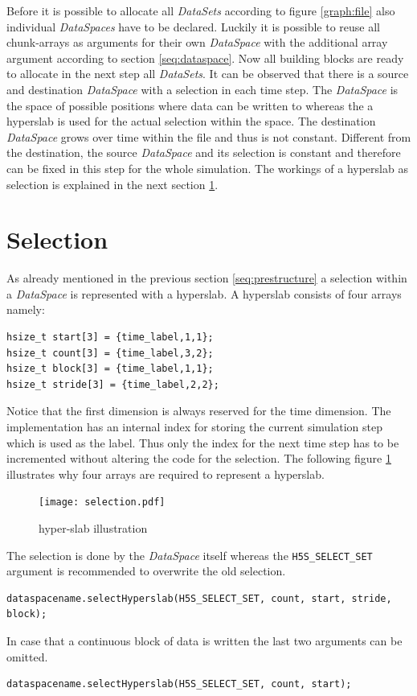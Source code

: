 Before it is possible to allocate all \textit{DataSets} according to figure \ref{graph:file} also individual \textit{DataSpaces} have to be declared. Luckily it is possible to reuse all chunk-arrays as arguments for their own \textit{DataSpace} with the additional array argument according to section \ref{seq:dataspace}. Now all building blocks are ready to allocate in the next step all \textit{DataSets}. It can be observed that there is a source and destination \textit{DataSpace} with a selection in each time step. The \textit{DataSpace} is the space of possible positions where data can be written to whereas the a hyperslab is used for the actual selection within the space. The destination \textit{DataSpace} grows over time within the file and thus is not constant. Different from the destination, the source \textit{DataSpace} and its selection is constant and therefore can be fixed in this step for the whole simulation. The workings of a hyperslab as selection is explained in the next section \ref{seq:selection}.

\section{Selection}
\label{seq:selection}
As already mentioned in the previous section \ref{seq:prestructure} a selection within a \textit{DataSpace} is represented with a hyperslab. A hyperslab consists of four arrays namely:
\begin{lstlisting}
hsize_t start[3] = {time_label,1,1};
hsize_t count[3] = {time_label,3,2};
hsize_t block[3] = {time_label,1,1};
hsize_t stride[3] = {time_label,2,2};
\end{lstlisting}
Notice that the first dimension is always reserved for the time dimension. The implementation has an internal index for storing the current simulation step which is used as the label. Thus only the index for the next time step has to be incremented without altering the code for the selection. The following figure \ref{fig:hyperslab} illustrates why four arrays are required to represent a hyperslab.

\begin{figure}[ht!]
\centering
\texttt{[image: selection.pdf]}
\caption{hyper-slab illustration}
\label{fig:hyperslab}
\end{figure}

The selection is done by the \textit{DataSpace} itself whereas the \texttt{H5S\_SELECT\_SET} argument is recommended to overwrite the old selection.
\begin{lstlisting}
dataspacename.selectHyperslab(H5S_SELECT_SET, count, start, stride, block);
\end{lstlisting}
In case that a continuous block of data is written the last two arguments can be omitted.
\begin{lstlisting}
dataspacename.selectHyperslab(H5S_SELECT_SET, count, start);
\end{lstlisting}


